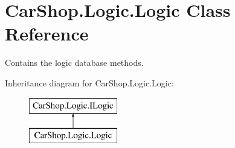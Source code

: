 \hypertarget{class_car_shop_1_1_logic_1_1_logic}{}\section{Car\+Shop.\+Logic.\+Logic Class Reference}
\label{class_car_shop_1_1_logic_1_1_logic}


Contains the logic database methods.  


Inheritance diagram for Car\+Shop.\+Logic.\+Logic\+:\begin{figure}[H]
\begin{center}
\leavevmode
\includegraphics[height=2.000000cm]{class_car_shop_1_1_logic_1_1_logic}
\end{center}
\end{figure}
